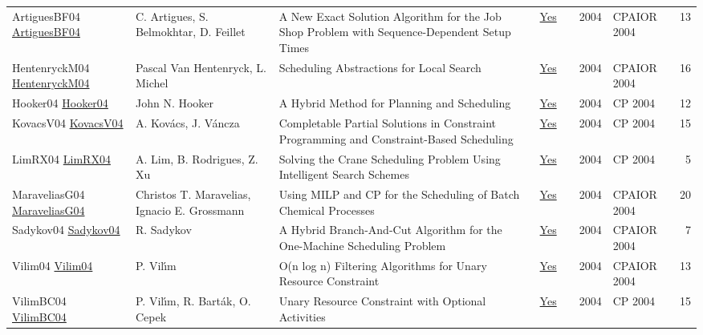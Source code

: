 {\begin{longtable}{p{3cm}p{6cm}p{7cm}rrrp{3cm}r}
ArtiguesBF04 \href{https://doi.org/10.1007/978-3-540-24664-0\_3}{ArtiguesBF04} & C. Artigues, S. Belmokhtar, D. Feillet & A New Exact Solution Algorithm for the Job Shop Problem with Sequence-Dependent Setup Times & \href{papers/ArtiguesBF04.pdf}{Yes} & \cite{ArtiguesBF04} & 2004 & CPAIOR 2004 & 13\\
HentenryckM04 \href{https://doi.org/10.1007/978-3-540-24664-0\_22}{HentenryckM04} & Pascal Van Hentenryck, L. Michel & Scheduling Abstractions for Local Search & \href{papers/HentenryckM04.pdf}{Yes} & \cite{HentenryckM04} & 2004 & CPAIOR 2004 & 16\\
Hooker04 \href{https://doi.org/10.1007/978-3-540-30201-8\_24}{Hooker04} & John N. Hooker & A Hybrid Method for Planning and Scheduling & \href{papers/Hooker04.pdf}{Yes} & \cite{Hooker04} & 2004 & CP 2004 & 12\\
KovacsV04 \href{https://doi.org/10.1007/978-3-540-30201-8\_26}{KovacsV04} & A. Kov{\'{a}}cs, J. V{\'{a}}ncza & Completable Partial Solutions in Constraint Programming and Constraint-Based Scheduling & \href{papers/KovacsV04.pdf}{Yes} & \cite{KovacsV04} & 2004 & CP 2004 & 15\\
LimRX04 \href{https://doi.org/10.1007/978-3-540-30201-8\_59}{LimRX04} & A. Lim, B. Rodrigues, Z. Xu & Solving the Crane Scheduling Problem Using Intelligent Search Schemes & \href{papers/LimRX04.pdf}{Yes} & \cite{LimRX04} & 2004 & CP 2004 & 5\\
MaraveliasG04 \href{https://doi.org/10.1007/978-3-540-24664-0\_1}{MaraveliasG04} & Christos T. Maravelias, Ignacio E. Grossmann & Using {MILP} and {CP} for the Scheduling of Batch Chemical Processes & \href{papers/MaraveliasG04.pdf}{Yes} & \cite{MaraveliasG04} & 2004 & CPAIOR 2004 & 20\\
Sadykov04 \href{https://doi.org/10.1007/978-3-540-24664-0\_31}{Sadykov04} & R. Sadykov & A Hybrid Branch-And-Cut Algorithm for the One-Machine Scheduling Problem & \href{papers/Sadykov04.pdf}{Yes} & \cite{Sadykov04} & 2004 & CPAIOR 2004 & 7\\
Vilim04 \href{https://doi.org/10.1007/978-3-540-24664-0\_23}{Vilim04} & P. Vil{\'{\i}}m & O(n log n) Filtering Algorithms for Unary Resource Constraint & \href{papers/Vilim04.pdf}{Yes} & \cite{Vilim04} & 2004 & CPAIOR 2004 & 13\\
VilimBC04 \href{https://doi.org/10.1007/978-3-540-30201-8\_8}{VilimBC04} & P. Vil{\'{\i}}m, R. Bart{\'{a}}k, O. Cepek & Unary Resource Constraint with Optional Activities & \href{papers/VilimBC04.pdf}{Yes} & \cite{VilimBC04} & 2004 & CP 2004 & 15\\

\end{longtable}}
